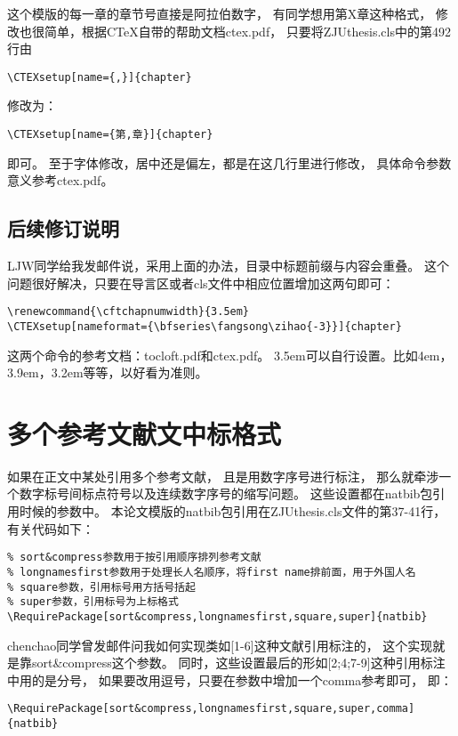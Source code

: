这个模版的每一章的章节号直接是阿拉伯数字，
有同学想用第X章这种格式，
修改也很简单，根据CTeX自带的帮助文档ctex.pdf，
只要将ZJUthesis.cls中的第492行由

{
\verb+\CTEXsetup[name={,}]{chapter}+
}

修改为：

{
\verb+\CTEXsetup[name={第,章}]{chapter}+
}

即可。
至于字体修改，居中还是偏左，都是在这几行里进行修改，
具体命令参数意义参考ctex.pdf。

\subsection{后续修订说明}
LJW同学给我发邮件说，采用上面的办法，目录中标题前缀与内容会重叠。
这个问题很好解决，只要在导言区或者cls文件中相应位置增加这两句即可：

{
\begin{verbatim}
\renewcommand{\cftchapnumwidth}{3.5em}
\CTEXsetup[nameformat={\bfseries\fangsong\zihao{-3}}]{chapter}
\end{verbatim}
}

这两个命令的参考文档：tocloft.pdf和ctex.pdf。
3.5em可以自行设置。比如4em，3.9em，3.2em等等，以好看为准则。


\section{多个参考文献文中标格式}

如果在正文中某处引用多个参考文献，
且是用数字序号进行标注，
那么就牵涉一个数字标号间标点符号以及连续数字序号的缩写问题。
这些设置都在natbib包引用时候的参数中。
本论文模版的natbib包引用在ZJUthesis.cls文件的第37-41行，有关代码如下：

{
\begin{verbatim}
% sort&compress参数用于按引用顺序排列参考文献
% longnamesfirst参数用于处理长人名顺序，将first name排前面，用于外国人名
% square参数，引用标号用方括号括起
% super参数，引用标号为上标格式
\RequirePackage[sort&compress,longnamesfirst,square,super]{natbib}
\end{verbatim}
}

chenchao同学曾发邮件问我如何实现类如[1-6]这种文献引用标注的，
这个实现就是靠sort\&compress这个参数。
同时，这些设置最后的形如[2;4;7-9]这种引用标注中用的是分号，
如果要改用逗号，只要在参数中增加一个comma参考即可，
即：

{
\begin{verbatim}
\RequirePackage[sort&compress,longnamesfirst,square,super,comma]{natbib}
\end{verbatim}
}

